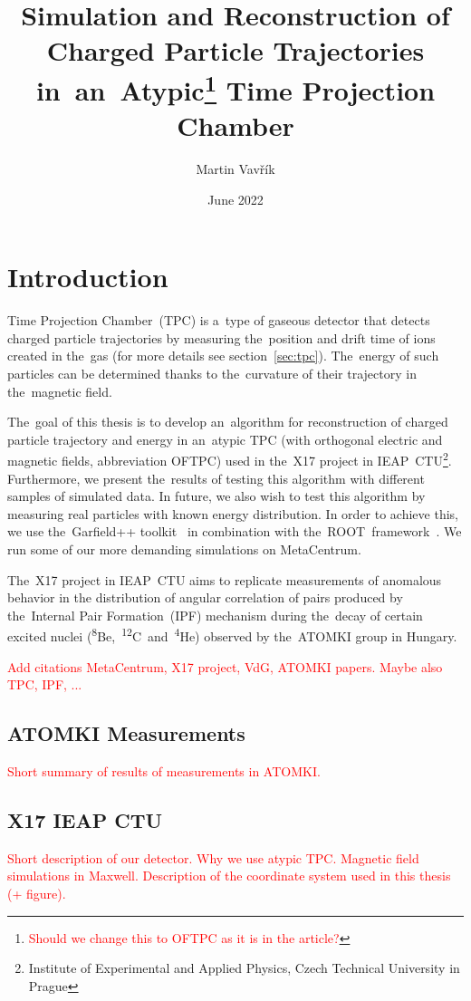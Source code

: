 \documentclass[]{article}
\title{Simulation and Reconstruction of Charged Particle Trajectories in~an~Atypic\footnote{\textcolor{red}{Should we change this to OFTPC as it is in the article?}} Time Projection Chamber}
\author{Martin Vavřík}
\date{June 2022}
\newcommand{\iso}[2]{\textsuperscript{#2}#1}   %
\begin{document}
	
	\maketitle
	
	\section{Introduction}
		Time Projection Chamber~(TPC) is a~type of gaseous detector that detects charged particle trajectories by measuring the~position and drift time of ions created in the~gas (for more details see section~\ref{sec:tpc}). The~energy of such particles can be determined thanks to the~curvature of their trajectory in the~magnetic field.
				
		The~goal of this thesis is to develop an~algorithm for reconstruction of charged particle trajectory and energy in an~atypic TPC (with orthogonal electric and magnetic fields, abbreviation OFTPC) used in the~X17 project in IEAP~CTU\footnote{Institute of Experimental and Applied Physics, Czech Technical University in Prague}. Furthermore, we present the~results of testing this algorithm with different samples of simulated data. In future, we also wish to test this algorithm by measuring real particles with known energy distribution. In order to achieve this, we use the~Garfield++ toolkit~\cite{Garfield++} in combination with the~ROOT~framework~\cite{ROOT}. We run some of our more demanding simulations on MetaCentrum.
		
		The~X17 project in IEAP~CTU aims to replicate measurements of anomalous behavior in the distribution of angular correlation of pairs produced by the~Internal Pair Formation~(IPF) mechanism during the~decay of certain excited nuclei (\iso{Be}{8},~\iso{C}{12}~and~\iso{He}{4}) observed by the~ATOMKI group in Hungary. 
		
		\textcolor{red}{Add citations MetaCentrum, X17 project, VdG, ATOMKI papers. Maybe also TPC, IPF, ...}
		
		\subsection{ATOMKI Measurements}
			\textcolor{red}{Short summary of results of measurements in ATOMKI.}
			
		\subsection{X17 IEAP CTU}
		\label{sec:IEAP}
			\textcolor{red}{Short description of our detector. Why we use atypic TPC. Magnetic field simulations in Maxwell. Description of the coordinate system used in this thesis (+ figure).}
					
\end{document}
